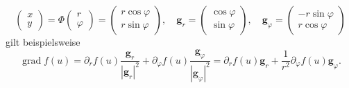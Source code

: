 \begin{equation}
\begin{pmatrix}x\\ y\end{pmatrix}
= \Phi\begin{pmatrix}r\\ \varphi\end{pmatrix}
= \begin{pmatrix}r\cos\varphi\\ r\sin\varphi\end{pmatrix},\quad
\mathbf g_r = \begin{pmatrix}\cos\varphi\\ \sin\varphi\end{pmatrix},\quad
\mathbf g_\varphi = \begin{pmatrix}-r\sin\varphi\\ r\cos\varphi\end{pmatrix}
\end{equation}
gilt beispielsweise
\begin{equation}
\operatorname{grad} f(u)
= \partial_r f(u)\frac{\mathbf g_r}{|\mathbf g_r|^2}
+ \partial_\varphi f(u)\frac{\mathbf g_\varphi}{|\mathbf g_\varphi|^2}
= \partial_r f(u)\mathbf g_r
+ \frac{1}{r^2}\partial_\varphi f(u)\mathbf g_\varphi.
\end{equation}

